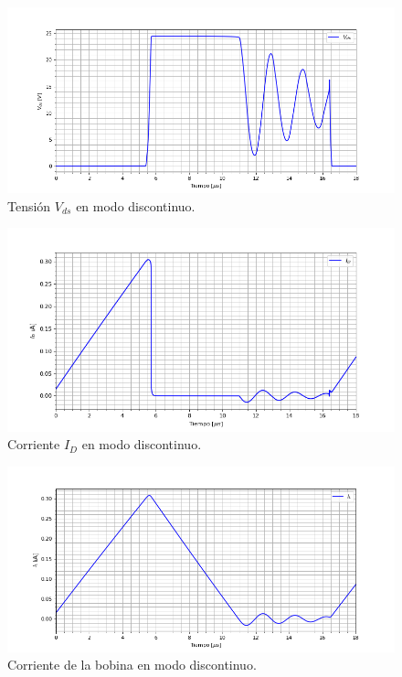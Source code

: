 \begin{figure}[H]
	\centering
	\includegraphics[width=0.85\linewidth]{ImagenesEjercicio-4/vds}
	\caption{Tensión $V_{ds}$ en modo discontinuo.}
	\label{ej4:fig:vds}
\end{figure}

\begin{figure}[H]
	\centering
	\includegraphics[width=0.85\linewidth]{ImagenesEjercicio-4/id}
	\caption{Corriente $I_D$ en modo discontinuo.}
	\label{ej4:fig:id}
\end{figure}

\begin{figure}[H]
	\centering
	\includegraphics[width=0.85\linewidth, page=1]{ImagenesEjercicio-4/il}
	\caption{Corriente de la bobina en modo discontinuo.}
	\label{ej4:fig:il}
\end{figure}

